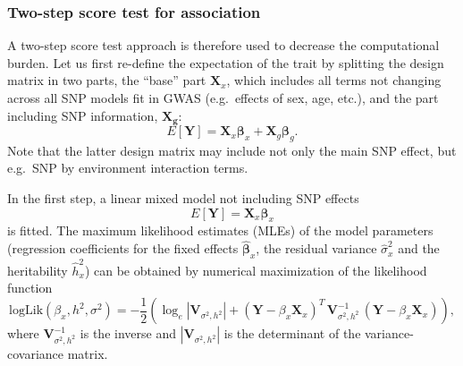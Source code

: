 \documentclass[12pt,a4paper]{article}
\begin{document}
\subsubsection{Two-step score test for association}
A two-step score test approach is therefore used to decrease the
computational burden. Let us first re-define the expectation of the
trait by splitting the design matrix in two parts, the ``base'' part
$\mathbf{X}_x$, which includes all terms not changing across all SNP
models fit in GWAS (e.g.\ effects of sex, age, etc.), and the part
including SNP information, $\mathbf{X_g}$:
$$
E[\mathbf{Y}] = \mathbf{X}_x \mathbf{\beta}_x +
\mathbf{X}_g \mathbf{\beta}_g.
$$
Note that the latter design matrix may include not only the main SNP
effect, but e.g.\ SNP by environment interaction terms.

In the first step, a linear mixed model not including SNP effects
$$
E[\mathbf{Y}] = \mathbf{X}_x \mathbf{\beta}_x
$$
is fitted. The maximum likelihood estimates (MLEs) of the model
parameters (regression coefficients for the fixed effects
$\hat{\mathbf{\beta}}_x$, the residual variance $\hat{\sigma}^2_x$ and
the heritability $\hat{h}^2_x$) can be obtained by numerical
maximization of the likelihood function
$$
\mathrm{logLik}(\beta_x,h^2,\sigma^2) = -\frac{1}{2} \left(
  \log_e|\mathbf{V}_{\sigma^2,h^2}| + (\mathbf{Y} - \beta_x
  \mathbf{X}_x)^T \, \mathbf{V}_{\sigma^2,h^2}^{-1} \, (\mathbf{Y} -
  \beta_x \mathbf{X}_x) \right ),
$$
where $\mathbf{V}_{\sigma^2,h^2}^{-1}$ is the inverse and
$|\mathbf{V}_{\sigma^2,h^2}|$ is the determinant of the
variance-covariance matrix.
\end{document}
